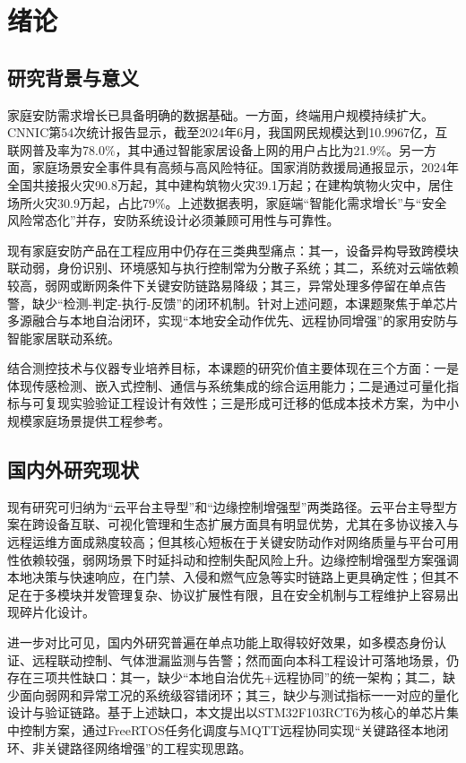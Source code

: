 \documentclass[UTF8,12pt,a4paper,oneside]{ctexbook}
\numberwithin{equation}{chapter}
\let\cite\supercite
\begin{document}
\mainmatter
\pagestyle{fancy}
\setcounter{page}{1}

\chapter{绪论}
\section{研究背景与意义}
家庭安防需求增长已具备明确的数据基础。一方面，终端用户规模持续扩大。CNNIC第54次统计报告显示，截至2024年6月，我国网民规模达到10.9967亿，互联网普及率为78.0\%，其中通过智能家居设备上网的用户占比为21.9\%\cite{cnnic54_2024}。另一方面，家庭场景安全事件具有高频与高风险特征。国家消防救援局通报显示，2024年全国共接报火灾90.8万起，其中建构筑物火灾39.1万起；在建构筑物火灾中，居住场所火灾30.9万起，占比79\%\cite{china_fire_2024}。上述数据表明，家庭端“智能化需求增长”与“安全风险常态化”并存，安防系统设计必须兼顾可用性与可靠性。

现有家庭安防产品在工程应用中仍存在三类典型痛点：其一，设备异构导致跨模块联动弱，身份识别、环境感知与执行控制常为分散子系统；其二，系统对云端依赖较高，弱网或断网条件下关键安防链路易降级；其三，异常处理多停留在单点告警，缺少“检测-判定-执行-反馈”的闭环机制。针对上述问题，本课题聚焦于单芯片多源融合与本地自治闭环，实现“本地安全动作优先、远程协同增强”的家用安防与智能家居联动系统。

结合测控技术与仪器专业培养目标，本课题的研究价值主要体现在三个方面：一是体现传感检测、嵌入式控制、通信与系统集成的综合运用能力；二是通过可量化指标与可复现实验验证工程设计有效性；三是形成可迁移的低成本技术方案，为中小规模家庭场景提供工程参考。
\section{国内外研究现状}
现有研究可归纳为“云平台主导型”和“边缘控制增强型”两类路径。云平台主导型方案在跨设备互联、可视化管理和生态扩展方面具有明显优势，尤其在多协议接入与远程运维方面成熟度较高\cite{smart_home_survey_2017,bozorgi2026_iot_arch,serepas2025_gateway}；但其核心短板在于关键安防动作对网络质量与平台可用性依赖较强，弱网场景下时延抖动和控制失配风险上升。边缘控制增强型方案强调本地决策与快速响应，在门禁、入侵和燃气应急等实时链路上更具确定性\cite{wang2024_stm32_linkage,yue2022_stm32_iot_home,cai2023_stm32f103_control}；但其不足在于多模块并发管理复杂、协议扩展性有限，且在安全机制与工程维护上容易出现碎片化设计。

进一步对比可见，国内外研究普遍在单点功能上取得较好效果，如多模态身份认证、远程联动控制、气体泄漏监测与告警\cite{alkanan2026_biometric,wang2024_home_security_wireless,yusuf2026_gas_leakage,dong2024_env_monitor}；然而面向本科工程设计可落地场景，仍存在三项共性缺口：其一，缺少“本地自治优先+远程协同”的统一架构；其二，缺少面向弱网和异常工况的系统级容错闭环；其三，缺少与测试指标一一对应的量化设计与验证链路。基于上述缺口，本文提出以STM32F103RCT6为核心的单芯片集中控制方案，通过FreeRTOS任务化调度与MQTT远程协同实现“关键路径本地闭环、非关键路径网络增强”的工程实现思路。
\end{document}
